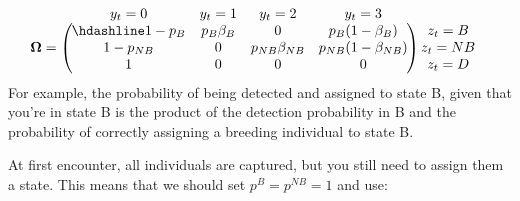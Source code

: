 \documentclass[
  12pt,
]{krantz}
\begin{document}
\[
\begin{matrix}
& \\
\mathbf{\Omega} =
    \left ( \vphantom{ \begin{matrix} 12 \\ 12 \\ 12\end{matrix} } \right .
\end{matrix}
\hspace{-1.2em}
\begin{matrix}
    y_t=0 & y_t=1 & y_t=2 & y_t=3\\ \hdashline
1 - p_B & p_B \beta_B & 0 & p_B (1-\beta_B) \\
1-p_{NB} & 0 & p_{NB} \beta_{NB} & p_{NB} (1-\beta_{NB})\\
1 & 0 & 0 & 0
\end{matrix}
\hspace{-0.2em}
\begin{matrix}
& \\
\left . \vphantom{ \begin{matrix} 12 \\ 12 \\ 12\end{matrix} } \right )
    \begin{matrix}
    z_{t}=B \\ z_{t}=NB \\ z_{t}=D
    \end{matrix}
\end{matrix}
\]
For example, the probability of being detected and assigned to state B, given that you're in state B is the product of the detection probability in B and the probability of correctly assigning a breeding individual to state B.

At first encounter, all individuals are captured, but you still need to assign them a state. This means that we should set \(p^B = p^{NB} = 1\) and use:
\end{document}
